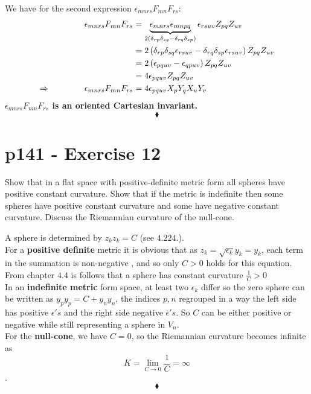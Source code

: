 We have for the second  expression $\epsilon_{mnrs} F_{mn}F_{rs}$:
\begin{align}
\epsilon_{mnrs} F_{mn}F_{rs}&=\underbrace{\epsilon_{mnrs}\epsilon_{mnpq}}_{2\left(\delta_{rp}\delta_{sq}-\delta_{rq}\delta_{sp}\right) }\epsilon_{rsuv} Z_{pq} Z_{uv}\\
&=2\left(\delta_{rp}\delta_{sq}\epsilon_{rsuv}-\delta_{rq}\delta_{sp}\epsilon_{rsuv}\right)Z_{pq} Z_{uv}\\
&=2\left(\epsilon_{pquv}-\epsilon_{qpuv}\right)Z_{pq} Z_{uv}\\
&=4\epsilon_{pquv}Z_{pq} Z_{uv}\\
\Rightarrow \quad\quad\quad\quad \epsilon_{mnrs} F_{mn}F_{rs}&=4\epsilon_{pquv}X_p  Y_q X_uY_v
\end{align}
\textbf{$\epsilon_{mnrs} F_{mn}F_{rs}$ is an oriented Cartesian invariant.}
$$\blacklozenge$$
\newpage

\section{p141 - Exercise 12}
\begin{tcolorbox}
Show that in a flat space with positive-definite metric form all spheres have positive constant curvature. Show that if the metric is indefinite then some spheres have positive constant curvature and some have negative constant curvature. Discuss the Riemannian curvature of the null-cone.
\end{tcolorbox}
A sphere is determined by $ z_kz_k= C$ (see $\mathbf{4.224.}$).\\
For a \textbf{positive definite} metric it is obvious that as $z_k= \sqrt{\epsilon_k}y_k = y_k$, each term in the summation is non-negative , and so only $C>0$ holds for this equation. From chapter $\mathbf{4.4}$ is follows that a sphere has constant curvature $\frac{1}{C} >0$\\
In an \textbf{indefinite metric} form space, at least two $\epsilon_k$ differ so the zero sphere can be written as $y_py_p=C +y_ny_n$, the indices $p, n$ regrouped in a way the left side has positive $\epsilon {'}s$ and the right side negative $\epsilon {'}s$. So $C$ can be either positive or negative while still representing a sphere in $V_n$.\\
For the \textbf{null-cone}, we have $C=0$, so the Riemannian curvature becomes infinite as $$K = \lim_{C\to 0}\frac{1}{C}= \infty$$.
$$\blacklozenge$$
\newpage

